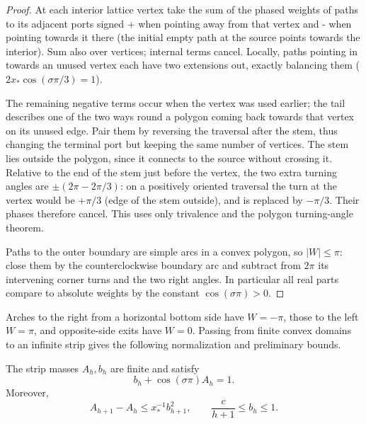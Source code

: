 \begin{proof}
At each interior lattice vertex take the sum of the phased weights of paths to its adjacent ports signed + when pointing away from that vertex and - when pointing towards it there (the initial empty path at the source points towards the interior). Sum also over vertices; internal terms cancel. Locally, paths pointing in towards an unused vertex each have two extensions out, exactly balancing them (\(2x_*\cos(\sigma\pi/3)=1\)).

The remaining negative terms occur when the vertex was used earlier; the tail describes one of the two ways round a polygon coming back towards that vertex on its unused edge. Pair them by reversing the traversal after the stem, thus changing the terminal port but keeping the same number of vertices. The stem lies outside the polygon, since it connects to the source without crossing it. Relative to the end of the stem just before the vertex, the two extra turning angles are \(\pm(2\pi-2\pi/3)\): on a positively oriented traversal the turn at the vertex would be \(+\pi/3\) (edge of the stem outside), and is replaced by \(-\pi/3\). Their phases therefore cancel. This uses only trivalence and the polygon turning-angle theorem.

Paths to the outer boundary are simple arcs in a convex polygon, so \(|W|\le\pi\): close them by the counterclockwise boundary arc and subtract from \(2\pi\) its intervening corner turns and the two right angles. In particular all real parts compare to absolute weights by the constant \(\cos(\sigma\pi)>0\).
\end{proof}

Arches to the right from a horizontal bottom side have \(W=-\pi\), those to the left \(W=\pi\), and opposite-side exits have \(W=0\). Passing from finite convex domains to an infinite strip gives the following normalization and preliminary bounds.

\begin{corollary}\label{cor:pv:strip-flux}
The strip masses \(A_h,b_h\) are finite and satisfy
\begin{equation}\label{eq:pv:strip-flux}
 b_h+\cos(\sigma\pi)A_h=1.
\end{equation}
Moreover,
\[
 A_{h+1}-A_h\le x_*^{-1} b_{h+1}^2,
 \qquad \frac{c}{h+1}\le b_h\le1.
\]
\end{corollary}

